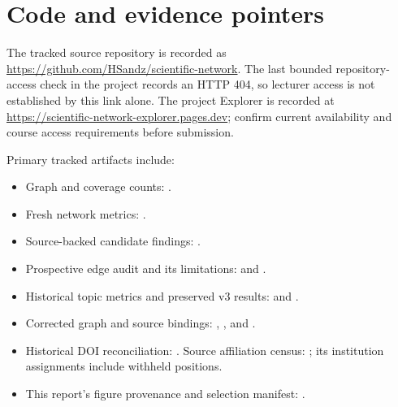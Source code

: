\section{Code and evidence pointers}

The tracked source repository is recorded as
\url{https://github.com/HSandz/scientific-network}.
The last bounded repository-access check in the project records an HTTP 404, so
lecturer access is not established by this link alone. The project Explorer is
recorded at
\url{https://scientific-network-explorer.pages.dev};
confirm current availability and course access requirements before submission.

Primary tracked artifacts include:
\begin{itemize}
  \item Graph and coverage counts: .
  \item Fresh network metrics: .
  \item Source-backed candidate findings: .
  \item Prospective edge audit and its limitations:  and .
  \item Historical topic metrics and preserved v3 results:  and .
  \item Corrected graph and source bindings: , , and .
  \item Historical DOI reconciliation: . Source affiliation census: ; its institution assignments include withheld positions.
  \item This report's figure provenance and selection manifest: .
\end{itemize}
